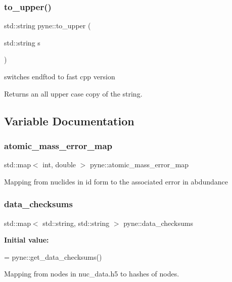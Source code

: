 \subsubsection{\texorpdfstring{to\+\_\+upper()}{to\_upper()}}
{\footnotesize\ttfamily std\+::string pyne\+::to\+\_\+upper (\begin{DoxyParamCaption}\item[{std\+::string}]{s }\end{DoxyParamCaption})}



switches endftod to fast cpp version 

Returns an all upper case copy of the string. 

\subsection{Variable Documentation}
\mbox{\label{namespacepyne_a70711189f1078e2ebc132db9ce7ab0a7}} 
\subsubsection{\texorpdfstring{atomic\+\_\+mass\+\_\+error\+\_\+map}{atomic\_mass\_error\_map}}
{\footnotesize\ttfamily std\+::map$<$ int, double $>$ pyne\+::atomic\+\_\+mass\+\_\+error\+\_\+map}

Mapping from nuclides in id form to the associated error in abdundance \mbox{\label{namespacepyne_a092bde815498a51a7532e3021a63ede5}} 
\subsubsection{\texorpdfstring{data\+\_\+checksums}{data\_checksums}}
{\footnotesize\ttfamily std\+::map$<$ std\+::string, std\+::string $>$ pyne\+::data\+\_\+checksums}

{\bfseries Initial value\+:}
\begin{DoxyCode}
=
  pyne::get\_data\_checksums()
\end{DoxyCode}


Mapping from nodes in nuc\+\_\+data.\+h5 to hashes of nodes. 


